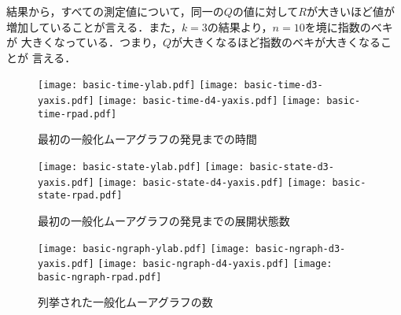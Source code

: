結果から，すべての測定値について，同一の$Q$の値に対して$R$が大きいほど値が
増加していることが言える．また，$k=3$の結果より，$n=10$を境に指数のベキが
大きくなっている．つまり，$Q$が大きくなるほど指数のベキが大きくなることが
言える．

\begin{figure}
  \centering
  \texttt{[image: basic-time-ylab.pdf]}
  \texttt{[image: basic-time-d3-yaxis.pdf]}\hspace{-3mm}
  \hspace{5mm}
  \texttt{[image: basic-time-d4-yaxis.pdf]}\hspace{-3mm}
  \texttt{[image: basic-time-rpad.pdf]}
  \caption{最初の一般化ムーアグラフの発見までの時間}
  \label{fig:basic-time}
\end{figure}

\begin{figure}
  \centering
  \texttt{[image: basic-state-ylab.pdf]}
  \texttt{[image: basic-state-d3-yaxis.pdf]}\hspace{-3mm}
  \hspace{5mm}
  \texttt{[image: basic-state-d4-yaxis.pdf]}\hspace{-3mm}
  \texttt{[image: basic-state-rpad.pdf]}
  \caption{最初の一般化ムーアグラフの発見までの展開状態数}
  \label{fig:basic-state}
\end{figure}

\begin{figure}
  \centering
  \texttt{[image: basic-ngraph-ylab.pdf]}
  \texttt{[image: basic-ngraph-d3-yaxis.pdf]}\hspace{-3mm}
  \hspace{5mm}
  \texttt{[image: basic-ngraph-d4-yaxis.pdf]}\hspace{-3mm}
  \texttt{[image: basic-ngraph-rpad.pdf]}
  \caption{列挙された一般化ムーアグラフの数}
  \label{fig:basic-ngraph}
\end{figure}
